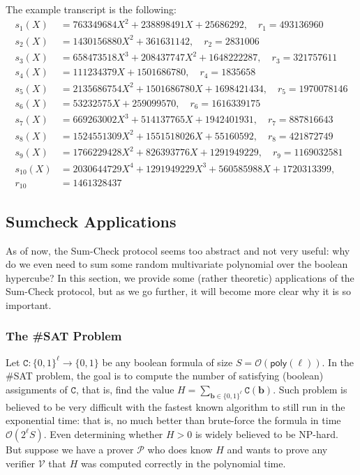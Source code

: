 \documentclass[../../book.tex]{subfiles}
\begin{document}
The example transcript is the following:
\begin{align*}
    s_1(X) &= 763349684X^2 + 238898491X + 25686292, \quad r_1 = 493136960 \\
    s_2(X) &= 1430156880X^2 + 361631142, \quad r_2 = 2831006 \\
    s_3(X) &= 658473518X^3 + 208437747X^2 + 1648222287, \quad r_3 = 321757611 \\
    s_4(X) &= 111234379X + 1501686780, \quad r_4 = 1835658 \\
    s_5(X) &= 2135686754X^2 + 1501686780X + 1698421434, \quad r_5 = 1970078146 \\
    s_6(X) &= 53232575X + 259099570, \quad r_6 = 1616339175 \\
    s_7(X) &= 669263002X^3 + 514137765X + 1942401931, \quad r_7 = 887816643 \\
    s_8(X) &= 1524551309X^2 + 1551518026X + 55160592, \quad r_8 = 421872749 \\
    s_9(X) &= 1766229428X^2 + 826393776X + 1291949229, \quad r_9 = 1169032581 \\
    s_{10}(X) &= 2030644729X^4 + 1291949229X^3 + 560585988X + 1720313399, \\
    r_{10} &= 1461328437
\end{align*}

\subsection{Sumcheck Applications}

As of now, the Sum-Check protocol seems too abstract and not very useful: why do
we even need to sum some random multivariate polynomial over the boolean
hypercube? In this section, we provide some (rather theoretic) applications of
the Sum-Check protocol, but as we go further, it will become more clear why it
is so important.

\subsubsection{The \#SAT Problem}

Let $\mathtt{C}: \{0,1\}^{\ell} \to \{0,1\}$ be any boolean formula of size $S =
\mathcal{O}(\mathsf{poly}(\ell))$. In the \#SAT problem, the goal is to compute
the number of satisfying (boolean) assignments of $\mathtt{C}$, that is, find
the value $H = \sum_{\boldsymbol{b} \in
\{0,1\}^{\ell}}\mathtt{C}(\boldsymbol{b})$. Such problem is believed to be very
difficult with the fastest known algorithm to still run in the exponential time:
that is, no much better than brute-force the formula in time
$\mathcal{O}(2^{\ell}S)$. Even determining whether $H > 0$ is widely believed to
be NP-hard. But suppose we have a prover $\mathcal{P}$ who does know $H$ and
wants to prove any verifier $\mathcal{V}$ that $H$ was computed correctly in the
polynomial time.
\end{document}
